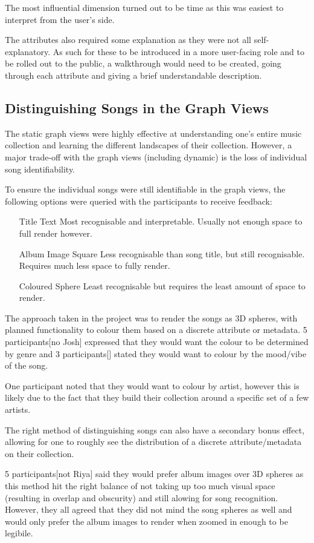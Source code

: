 The most influential dimension turned out to be time as this was easiest to interpret from the user's side.

The attributes also required some explanation as they were not all self-explanatory. As such for these to be introduced in a more user-facing role and to be rolled out to the public, a walkthrough would need to be created, going through each attribute and giving a brief understandable description.


\subsection{Distinguishing Songs in the Graph Views}
The static graph views were highly effective at understanding one's entire music collection and learning the different landscapes of their collection. However, a major trade-off with the graph views (including dynamic) is the loss of individual song identifiability. 

To ensure the individual songs were still identifiable in the graph views, the following options were queried with the participants to receive feedback:\begin{itemize}
    \item[Title Text] Most recognisable and interpretable. Usually not enough space to full render however.
    \item[Album Image Square] Less recognisable than song title, but still recognisable. Requires much less space to fully render.
    \item[Coloured Sphere] Least recognisable but requires the least amount of space to render.
\end{itemize}

The approach taken in the project was to render the songs as 3D spheres, with planned functionality to colour them based on a discrete attribute or metadata. 5 participants[no Josh] expressed that they would want the colour to be determined by genre and 3 participants[] stated they would want to colour by the mood/vibe of the song.

One participant noted that they would want to colour by artist, however this is likely due to the fact that they build their collection around a specific set of a few artists.

The right method of distinguishing songs can also have a secondary bonus effect, allowing for one to roughly see the distribution of a discrete attribute/metadata on their collection.

5 participants[not Riya] said they would prefer album images over 3D spheres as this method hit the right balance of not taking up too much visual space (resulting in overlap and obscurity) and still alowing for song recognition. However, they all agreed that they did not mind the song spheres as well and would only prefer the album images to render when zoomed in enough to be legibile.